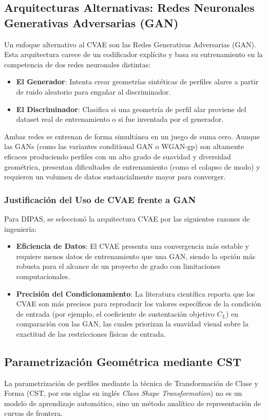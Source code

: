 \subsection{Arquitecturas Alternativas: Redes Neuronales Generativas Adversarias (GAN)}
Un enfoque alternativo al CVAE son las Redes Generativas Adversarias (GAN). Esta arquitectura carece de un codificador explícito y basa su entrenamiento en la competencia de dos redes neuronales distintas:
\begin{itemize}
    \item \textbf{El Generador}: Intenta crear geometrías sintéticas de perfiles alares a partir de ruido aleatorio para engañar al discriminador.
    \item \textbf{El Discriminador}: Clasifica si una geometría de perfil alar proviene del dataset real de entrenamiento o si fue inventada por el generador.
\end{itemize}

Ambas redes se entrenan de forma simultánea en un juego de suma cero. Aunque las GANs (como las variantes conditional GAN o WGAN-gp) son altamente eficaces produciendo perfiles con un alto grado de suavidad y diversidad geométrica, presentan dificultades de entrenamiento (como el colapso de modo) y requieren un volumen de datos sustancialmente mayor para converger. 

\subsubsection{Justificación del Uso de CVAE frente a GAN}
Para DIPAS, se seleccionó la arquitectura CVAE por las siguientes razones de ingeniería:
\begin{itemize}
    \item \textbf{Eficiencia de Datos}: El CVAE presenta una convergencia más estable y requiere menos datos de entrenamiento que una GAN, siendo la opción más robusta para el alcance de un proyecto de grado con limitaciones computacionales.
    \item \textbf{Precisión del Condicionamiento}: La literatura científica reporta que los CVAE son más precisos para reproducir los valores específicos de la condición de entrada (por ejemplo, el coeficiente de sustentación objetivo $C_L$) en comparación con las GAN, las cuales priorizan la suavidad visual sobre la exactitud de las restricciones físicas de entrada.
\end{itemize}

\subsection{Parametrización Geométrica mediante CST}
La parametrización de perfiles mediante la técnica de Transformación de Clase y Forma (CST, por sus siglas en inglés \textit{Class Shape Transformation}) no es un modelo de aprendizaje automático, sino un método analítico de representación de curvas de frontera.

